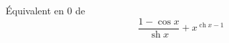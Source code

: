\'{E}quivalent en 0 de
\[\frac{1-\cos x}{\mathop{\mathrm{sh}}x}+ x^{\mathop{\mathrm{ch}}x - 1}\]
\bigskip\bigskip 